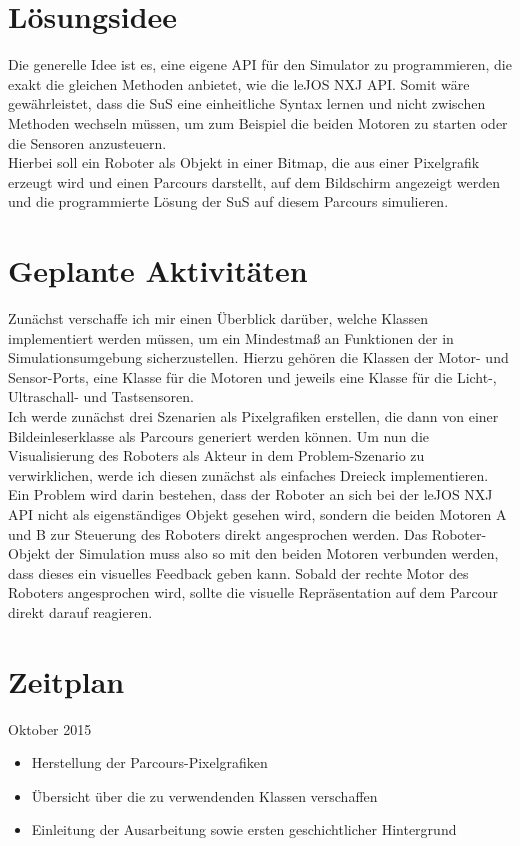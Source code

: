 \documentclass[paper=a4, pagesize, DIV=calc, BCOR=12.5mm, twoside=on, onecolumn=on, open = any, titlepage =on, parskip =half-, headsepline = on, footsepline = on, chapterprefix = on, appendixprefix = off, fontsize = 12pt, numbers = noenddot, abstract = on]{scrbook}
\numberwithin{equation}{chapter}
\begin{document}
\par \singlespacing
\section*{Lösungsidee}
\onehalfspacing
Die generelle Idee ist es, eine eigene API für den Simulator zu programmieren, die exakt die gleichen Methoden anbietet, wie die leJOS NXJ API. Somit wäre gewährleistet, dass die SuS eine einheitliche Syntax lernen und nicht zwischen Methoden wechseln müssen, um zum Beispiel die beiden Motoren zu starten oder die Sensoren anzusteuern.\\
Hierbei soll ein Roboter als Objekt in einer Bitmap, die aus einer Pixelgrafik erzeugt wird und einen Parcours darstellt, auf dem Bildschirm angezeigt werden und die programmierte Lösung der SuS auf diesem Parcours simulieren.\\


\par \singlespacing
\section*{Geplante Aktivitäten}
\onehalfspacing
Zunächst verschaffe ich mir einen Überblick darüber, welche Klassen implementiert werden müssen, um ein Mindestmaß an Funktionen der in Simulationsumgebung sicherzustellen. Hierzu gehören die Klassen der Motor- und Sensor-Ports, eine Klasse für die Motoren und jeweils eine Klasse für die Licht-, Ultraschall- und Tastsensoren.\\
Ich werde zunächst drei Szenarien als Pixelgrafiken erstellen, die dann von einer Bildeinleserklasse als Parcours generiert werden können. Um nun die Visualisierung des Roboters als Akteur in dem Problem-Szenario zu verwirklichen, werde ich diesen zunächst als einfaches Dreieck implementieren.\\
Ein Problem wird darin bestehen, dass der Roboter an sich bei der leJOS NXJ API nicht als eigenständiges Objekt gesehen wird, sondern die beiden Motoren A und B zur Steuerung des Roboters direkt angesprochen werden. Das Roboter-Objekt der Simulation muss also so mit den beiden Motoren verbunden werden, dass dieses ein visuelles Feedback geben kann. Sobald der rechte Motor des Roboters angesprochen wird, sollte die visuelle Repräsentation auf dem Parcour direkt darauf reagieren. 

\par \singlespacing
\section*{Zeitplan}
\onehalfspacing
Oktober 2015 
\begin{itemize}
\item Herstellung der Parcours-Pixelgrafiken
\item	Übersicht über die zu verwendenden Klassen verschaffen
\item	Einleitung der Ausarbeitung sowie ersten geschichtlicher Hintergrund
\end{itemize}
\end{document}
